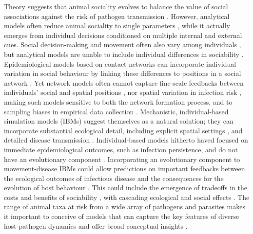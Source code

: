 Theory suggests that animal sociality evolves to balance the value of social associations against the risk of pathogen transmission \autocite[][]{bonds2005,prado2009,ashby2022}.
However, analytical models often reduce animal sociality to single parameters \autocite[][]{bonds2005,prado2009,ashby2022}, while it actually emerges from individual decisions conditioned on multiple internal and external cues.
Social decision-making and movement often also vary among individuals \autocite{tanner2012,wolf2012,spiegel2017}, but analytical models are unable to include individual differences in sociability \autocite{gartland2021}.
Epidemiological models based on contact networks can incorporate individual variation in social behaviour by linking these differences to positions in a social network \autocite{white2017,albery2021,albery2020}.
Yet network models often cannot capture fine-scale feedbacks between individuals' social and spatial positions \autocite{albery2021,albery2020}, nor spatial variation in infection risk \autocite{albery2022}, making such models sensitive to both the network formation process, and to sampling biases in empirical data collection \autocite[][]{white2017}.
Mechanistic, individual-based simulation models (IBMs) suggest themselves as a natural solution; they can incorporate substantial ecological detail, including explicit spatial settings \autocite{deangelis2019}, and detailed disease transmission \autocite{white2018, scherer2020,lunn2021,white2018a}.
Individual-based models hitherto haved focused on immediate epidemiological outcomes, such as infection persistence, and do not have an evolutionary component \autocite{white2018,scherer2020,lunn2021}.
Incorporating an evolutionary component to movement-disease IBMs could allow predictions on important feedbacks between the ecological outcomes of infectious disease and the consequences for the evolution of host behaviour \autocite{cantor2021}.
This could include the emergence of tradeoffs in the costs and benefits of sociability \autocite{gartland2021}, with cascading ecological and social effects \autocite{monk2022,spiegel2017,tanner2012,webber2022}.
The range of animal taxa at risk from a wide array of pathogens and parasites \autocite{carlson2022a,sanderson2020} makes it important to conceive of models that can capture the key features of diverse host-pathogen dynamics and offer broad conceptual insights \autocite{white2018a,white2018}.

